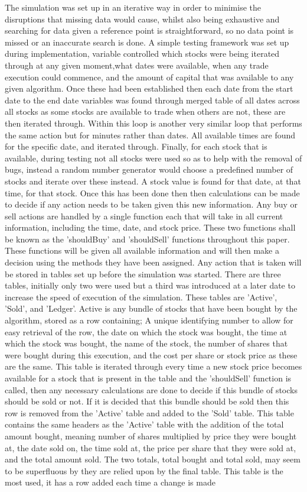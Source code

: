 \documentclass[12pt,a4paper]{article}
\begin{document}
The simulation was set up in an iterative way in order to minimise the disruptions that missing data would cause, whilst also being exhaustive and searching for data given a reference point is straightforward, so no data point is missed or an inaccurate search is done. A simple testing framework was set up during implementation, variable controlled which stocks were being iterated through at any given moment,what dates were available, when any trade execution could commence, and the amount of capital that was available to any given algorithm. Once these had been established then each date from the start date to the end date variables was found through merged table of all dates across all stocks as some stocks are available to trade when others are not, these are then iterated through. Within this loop is another very similar loop that performs the same action but for minutes rather than dates. All available times are found for the specific date, and iterated through. Finally, for each stock that is available, during testing not all stocks were used so as to help with the removal of bugs, instead a random number generator would choose a predefined number of stocks and iterate over these instead. A stock value is found for that date, at that time, for that stock. Once this has been done then then calculations can be made to decide if any action needs to be taken given this new information. Any buy or sell actions are handled by a single function each that will take in all current information, including the time, date, and stock price. These two functions shall be known as the 'shouldBuy' and 'shouldSell' functions throughout this paper. These functions will be given all available information and will then make a decision using the methods they have been assigned. Any action that is taken will be stored in tables set up before the simulation was started. There are three tables, initially only two were used but a third was introduced at a later date to increase the speed of execution of the simulation. These tables are 'Active', 'Sold', and 'Ledger'. Active is any bundle of stocks that have been bought by the algorithm, stored as a row containing; A unique identifying number to allow for easy retrieval of the row, the date on which the stock was bought, the time at which the stock was bought, the name of the stock, the number of shares that were bought during this execution, and the cost per share or stock price as these are the same. This table is iterated through every time a new stock price becomes available for a stock that is present in the table and the 'shouldSell' function is called, then any necessary calculations are done to decide if this bundle of stocks should be sold or not. If it is decided that this bundle should be sold then this row is removed from the 'Active' table and added to the 'Sold' table. This table contains the same headers as the 'Active' table with the addition of the total amount bought, meaning number of shares multiplied by price they were bought at, the date sold on, the time sold at, the price per share that they were sold at, and the total amount sold. The two totals, total bought and total sold, may seem to be superfluous by they are relied upon by the final table. This table is the most used, it has a row added each time a change is made 
\end{document}
